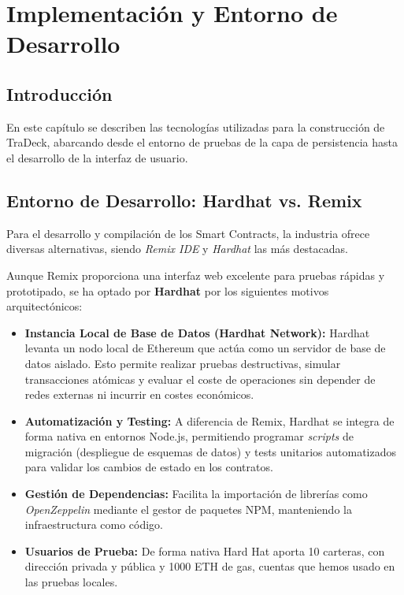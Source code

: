\chapter{Implementación y Entorno de Desarrollo}\label{cap:implementacion}

\section{Introducción}
En este capítulo se describen las tecnologías utilizadas para la construcción de TraDeck, abarcando desde el entorno de pruebas de la capa de persistencia hasta el desarrollo de la interfaz de usuario.

\section{Entorno de Desarrollo: Hardhat vs. Remix}
Para el desarrollo y compilación de los Smart Contracts, la industria ofrece diversas alternativas, 
siendo \textit{Remix IDE} y \textit{Hardhat} las más destacadas. 

Aunque Remix proporciona una interfaz web excelente para pruebas rápidas y prototipado, se ha optado 
por \textbf{Hardhat} \cite{hardhat_docs} por los siguientes motivos arquitectónicos:

\begin{itemize}
	\item \textbf{Instancia Local de Base de Datos (Hardhat Network):} Hardhat levanta un nodo local 
	de Ethereum que actúa como un servidor de base de datos aislado. Esto permite realizar pruebas 
	destructivas, simular transacciones atómicas y evaluar el coste de operaciones sin depender 
	de redes externas ni incurrir en costes económicos.
	\item \textbf{Automatización y Testing:} A diferencia de Remix, Hardhat se integra de forma 
	nativa en entornos Node.js, permitiendo programar \textit{scripts} de migración (despliegue 
	de esquemas de datos) y tests unitarios automatizados para validar los cambios de estado en 
	los contratos.
	\item \textbf{Gestión de Dependencias:} Facilita la importación de librerías como \textit{OpenZeppelin} 
	mediante el gestor de paquetes NPM, manteniendo la infraestructura como código.
	\item \textbf{Usuarios de Prueba:} De forma nativa Hard Hat aporta 10 carteras, con dirección 
	privada y pública y 1000 ETH de gas, cuentas que hemos usado en las pruebas locales.
\end{itemize}

